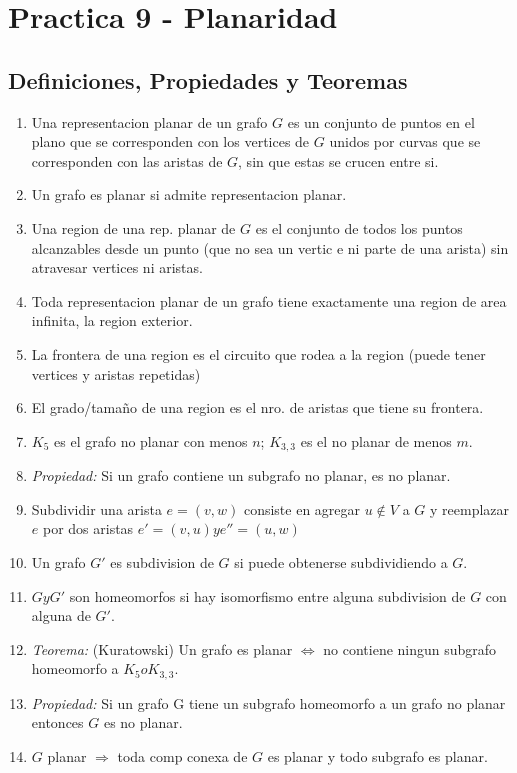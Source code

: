 \section{Practica 9 - Planaridad}
\subsection{Definiciones, Propiedades y Teoremas}
\begin{enumerate}
\item Una representacion planar de un grafo $G$ es un conjunto de puntos en el plano que se corresponden con los vertices de $G$ unidos por curvas que se corresponden con las aristas de $G$, sin que estas se crucen entre si.
\item Un grafo es planar si admite representacion planar.
\item Una region de una rep. planar de $G$ es el conjunto de todos los puntos alcanzables desde un punto (que no sea un vertic e ni parte de una arista) sin atravesar vertices ni aristas.
\item Toda representacion planar de un grafo tiene exactamente una region de area infinita, la region exterior.
\item La frontera de una region es el circuito que rodea a la region (puede tener vertices y aristas repetidas)
\item El grado/tamaño de una region es el nro. de aristas que tiene su frontera.
\item $K_{5}$ es el grafo no planar con menos $n$; $K_{3,3}$ es el no planar de menos $m$.
\item \textit{Propiedad:} Si un grafo contiene un subgrafo no planar, es no planar.
\item Subdividir una arista $e=(v,w)$ consiste en agregar $u \notin V$ a $G$ y reemplazar $e$ por dos aristas $e'=(v,u) y e''=(u,w)$
\item Un grafo $G'$ es subdivision de $G$ si puede obtenerse subdividiendo a $G$.
\item $G y G'$ son homeomorfos si hay isomorfismo entre alguna subdivision de $G$ con alguna de $G'$.
\item \textit{Teorema:} (Kuratowski) Un grafo es planar $\iff$ no contiene ningun subgrafo homeomorfo a $K_{5} o K_{3,3}$.
\item \textit{Propiedad:} Si un grafo G tiene un subgrafo homeomorfo a un grafo no planar entonces $G$ es no planar.
\item $G$ planar $\Rightarrow$ toda comp conexa de $G$ es planar y todo subgrafo es planar.

\end{enumerate}
